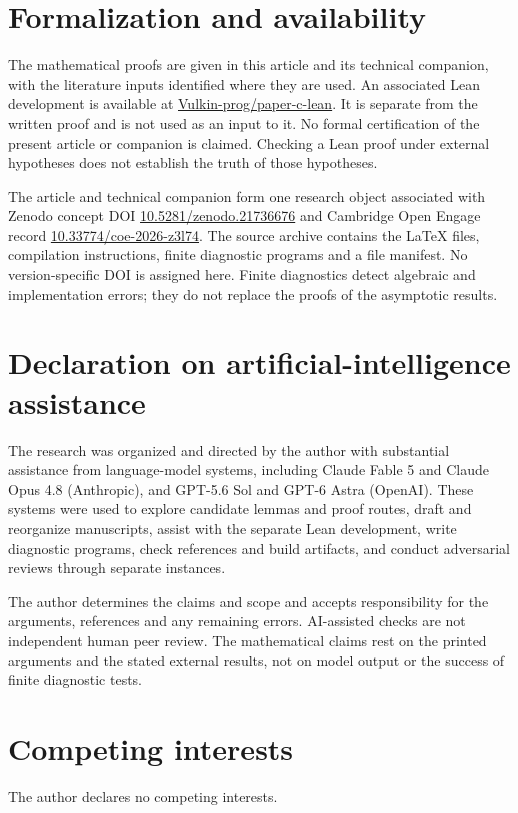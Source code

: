 \section*{Formalization and availability}
The mathematical proofs are given in this article and its technical
companion, with the literature inputs identified where they are used.
An associated Lean development is available at
\href{https://github.com/Vulkin-prog/paper-c-lean}{Vulkin-prog/paper-c-lean}.
It is separate from the written proof and is not used as an input to it.
No formal certification of the present article or companion is claimed.
Checking a Lean proof under external hypotheses does not establish the
truth of those hypotheses.

The article and technical companion form one research object associated
with Zenodo concept DOI
\href{https://doi.org/10.5281/zenodo.21736676}{10.5281/zenodo.21736676}
and Cambridge Open Engage record
\href{https://doi.org/10.33774/coe-2026-z3l74}{10.33774/coe-2026-z3l74}.
The source archive contains the LaTeX files, compilation instructions,
finite diagnostic programs and a file manifest. No version-specific DOI
is assigned here. Finite diagnostics detect algebraic and implementation
errors; they do not replace the proofs of the asymptotic results.

\section*{Declaration on artificial-intelligence assistance}
\label{sec:ai-assistance}
The research was organized and directed by the author with substantial
assistance from language-model systems, including Claude Fable 5 and
Claude Opus 4.8 (Anthropic), and GPT-5.6 Sol and GPT-6 Astra (OpenAI).
These systems were used to explore candidate lemmas and proof routes,
draft and reorganize manuscripts, assist with the separate Lean development,
write diagnostic programs, check references and build artifacts, and
conduct adversarial reviews through separate instances.

The author determines the claims and scope and accepts responsibility for
the arguments, references and any remaining errors. AI-assisted checks are
not independent human peer review. The mathematical claims rest on the
printed arguments and the stated external results, not on model output or
the success of finite diagnostic tests.

\section*{Competing interests}
The author declares no competing interests.
